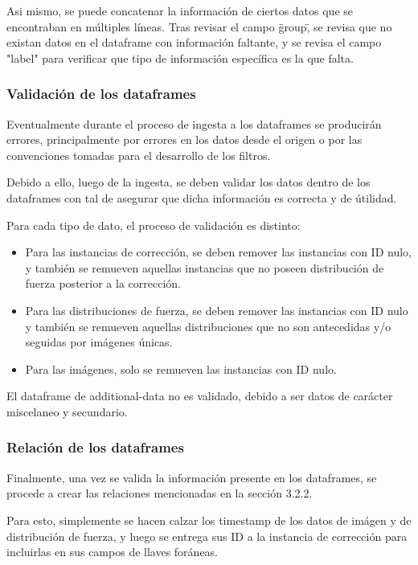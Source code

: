 Asi mismo, se puede concatenar la información de ciertos datos que se encontraban en múltiples líneas. Tras revisar el campo \"group\", se revisa que no existan datos en el dataframe con información faltante, y se revisa el campo "label" para verificar que tipo de información específica es la que falta.

\subsubsection{Validación de los dataframes}

Eventualmente durante el proceso de ingesta a los dataframes se producirán errores, principalmente por errores en los datos desde el origen o por las convenciones tomadas para el desarrollo de los filtros.

Debido a ello, luego de la ingesta, se deben validar los datos dentro de los dataframes con tal de asegurar que dicha información es correcta y de útilidad.

Para cada tipo de dato, el proceso de validación es distinto:

\begin{itemize}
    \item Para las instancias de corrección, se deben remover las instancias con ID nulo, y también se remueven aquellas instancias que no poseen distribución de fuerza posterior a la corrección.

    \item Para las distribuciones de fuerza, se deben remover las instancias con ID nulo y también se remueven aquellas distribuciones que no son antecedidas y/o seguidas por imágenes únicas.

    \item Para las imágenes, solo se remueven las instancias con ID nulo.
\end{itemize}

El dataframe de additional-data no es validado, debido a ser datos de carácter miscelaneo y secundario.

\subsubsection{Relación de los dataframes}

Finalmente, una vez se valida la información presente en los dataframes, se procede a crear las relaciones mencionadas en la sección 3.2.2.

Para esto, simplemente se hacen calzar los timestamp de los datos de imágen y de distribución de fuerza, y luego se entrega sus ID a la instancia de corrección para incluirlas en sus campos de llaves foráneas.